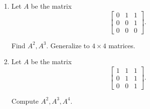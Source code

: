 \begin{exercise}
    \begin{enumerate}[label={(\alph*)}]
        \item Let $A$ be the matrix
              \[
                  \begin{bmatrix}
                      0 & 1 & 1 \\
                      0 & 0 & 1 \\
                      0 & 0 & 0
                  \end{bmatrix}.
              \]

              Find $A^{2}, A^{3}$. Generalize to $4\times 4$ matrices.
        \item Let $A$ be the matrix
              \[
                  \begin{bmatrix}
                      1 & 1 & 1 \\
                      0 & 1 & 1 \\
                      0 & 0 & 1
                  \end{bmatrix}.
              \]

              Compute $A^{2}, A^{3}, A^{4}$.
    \end{enumerate}
\end{exercise}

